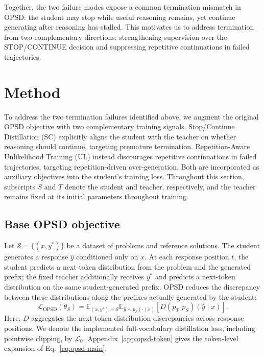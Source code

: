 \documentclass{article} %
\begin{document}
Together, the two failure modes expose a common termination mismatch in OPSD: the student may stop while useful reasoning remains, yet continue generating after reasoning has stalled. This motivates us to address termination from two complementary directions: strengthening supervision over the STOP/CONTINUE decision and suppressing repetitive continuations in failed trajectories.


\section{Method}
\label{sec:method}

To address the two termination failures identified above, we augment the original OPSD objective with two complementary training signals. Stop/Continue Distillation (SC) explicitly aligns the student with the teacher on whether reasoning should continue, targeting premature termination. Repetition-Aware Unlikelihood Training (UL) instead discourages repetitive continuations in failed trajectories, targeting repetition-driven over-generation. Both are incorporated as auxiliary objectives into the student's training loss. Throughout this section, subscripts $S$ and $T$ denote the student and teacher, respectively, and the teacher remains fixed at its initial parameters throughout training.

\subsection{Base OPSD objective}
\label{sec:base-opsd}

Let $\mathcal S=\{(x,y^*)\}$ be a dataset of problems and reference solutions. The student generates a response $\hat y$ conditioned only on $x$. At each response position $t$, the student predicts a next-token distribution from the problem and the generated prefix; the fixed teacher additionally receives $y^*$ and predicts a next-token distribution on the same student-generated prefix. OPSD reduces the discrepancy between these distributions along the prefixes actually generated by the student:
\begin{equation}
\mathcal L_{\mathrm{OPSD}}(\theta_S)
=
\mathbb E_{(x,y^*)\sim\mathcal S}
\mathbb E_{\hat y\sim p_S(\cdot\mid x)}
\left[D(p_T\Vert p_S)(\hat y\mid x)\right].
\label{eq:opsd-main}
\end{equation}
Here, $D$ aggregates the next-token distribution discrepancies across response positions. We denote the implemented full-vocabulary distillation loss, including pointwise clipping, by $\mathcal L_0$. Appendix~\ref{app:opsd-token} gives the token-level expansion of Eq.~\ref{eq:opsd-main}.
\end{document}
